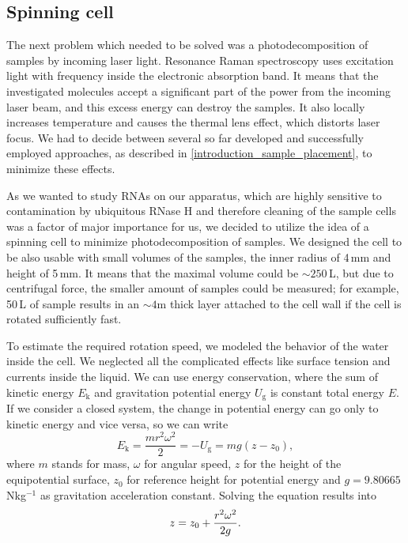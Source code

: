 \subsection{Spinning cell}
\label{spinning_cell}

The next problem which needed to be solved was a photodecomposition of samples
by incoming laser light.
Resonance Raman spectroscopy uses excitation light with frequency inside the
electronic absorption band.
It means that the investigated molecules accept a significant part of the power
from the incoming laser beam, and this excess energy can destroy the samples.
It also locally
increases temperature and causes the thermal lens effect, which distorts laser
focus.
We had to decide between several so far developed and successfully employed
approaches, as described in
\cref{introduction_sample_placement},
to minimize these effects.

As we wanted to study RNAs on our apparatus, which are highly sensitive to
contamination by ubiquitous RNase H and therefore cleaning of the sample cells
was a factor of major importance for us, we decided to utilize the idea of a
spinning cell to minimize photodecomposition of samples.
We designed the cell to be also usable with small volumes of the samples, the
inner radius of 4\,mm and height of 5\,mm.
It means that the maximal volume could be $\sim250$\,L, but due to
centrifugal force, the smaller amount of samples could be measured;
for example, 50\,L of sample results in an $\sim 4$m thick layer
attached to the cell wall if the cell is rotated sufficiently fast.

To estimate the required rotation speed, we modeled the behavior of the water
inside the cell.
We neglected all the complicated effects like surface tension and currents
inside the liquid.
We can use energy conservation, where the sum of kinetic energy $E_\text{k}$
and gravitation potential energy $U_\text{g}$ is constant total energy $E$.
If we consider a closed system, the change in potential energy can go only to
kinetic energy and vice versa, so we can write
\begin{equation*}
	E_\text{k} = \frac{mr^2\omega^2}{2} = -U_\text{g} = mg(z - z_0),
\end{equation*}
where $m$ stands for mass, $\omega$ for angular speed, $z$ for the height of
the equipotential surface, $z_0$ for reference height for potential energy and
$g = 9.80665$\, Nkg$^{-1}$ as gravitation acceleration constant.
Solving the equation results into
\begin{equation}
	z = z_0 + \frac{r^2\omega^2}{2g}.
	\label{\eqnlabel{spinning_cell:liquid_surface}}
\end{equation}

